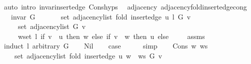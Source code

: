\begin{isabellebody}
\ {\isacharparenleft}{\kern0pt}auto\ intro{\isacharcolon}{\kern0pt}\ invar{\isacharunderscore}{\kern0pt}insert{\isacharunderscore}{\kern0pt}edge\ Cons{\isachardot}{\kern0pt}hyps{\isacharparenright}{\kern0pt}\isanewline
{}\isamarkupfalse%
%
\endisatagproof
{\isafoldproof}%
%
\isadelimproof
\isanewline
%
\endisadelimproof
\isanewline
{}\isamarkupfalse%
\ {\isacharparenleft}{\kern0pt}\ adjacency{\isacharparenright}{\kern0pt}\ adjacency{\isacharunderscore}{\kern0pt}fold{\isacharunderscore}{\kern0pt}insert{\isacharunderscore}{\kern0pt}edge{\isacharunderscore}{\kern0pt}cong{\isacharcolon}{\kern0pt}\isanewline
\ \ \ {\isachardoublequoteopen}invar\ G{\isachardoublequoteclose}\isanewline
\ \ \isanewline
\ \ \ \ {\isachardoublequoteopen}set\ {\isacharparenleft}{\kern0pt}adjacency{\isacharunderscore}{\kern0pt}list\ {\isacharparenleft}{\kern0pt}fold\ {\isacharparenleft}{\kern0pt}insert{\isacharunderscore}{\kern0pt}edge\ u{\isacharparenright}{\kern0pt}\ l\ G{\isacharparenright}{\kern0pt}\ v{\isacharparenright}{\kern0pt}\ {\isacharequal}{\kern0pt}\isanewline
\ \ \ \ \ set\ {\isacharparenleft}{\kern0pt}adjacency{\isacharunderscore}{\kern0pt}list\ G\ v{\isacharparenright}{\kern0pt}\ {\isasymunion}\isanewline
\ \ \ \ \ {\isacharparenleft}{\kern0pt}{\isasymUnion}w{\isasymin}set\ l{\isachardot}{\kern0pt}\ if\ v\ {\isacharequal}{\kern0pt}\ u\ then\ {\isacharbraceleft}{\kern0pt}w{\isacharbraceright}{\kern0pt}\ else\ if\ v\ {\isacharequal}{\kern0pt}\ w\ then\ {\isacharbraceleft}{\kern0pt}u{\isacharbraceright}{\kern0pt}\ else\ {\isacharbraceleft}{\kern0pt}{\isacharbraceright}{\kern0pt}{\isacharparenright}{\kern0pt}{\isachardoublequoteclose}\isanewline
%
\isadelimproof
\ \ %
\endisadelimproof
%
\isatagproof
{}\isamarkupfalse%
\ assms\isanewline
{}\isamarkupfalse%
\ {\isacharparenleft}{\kern0pt}induct\ l\ arbitrary{\isacharcolon}{\kern0pt}\ G{\isacharparenright}{\kern0pt}\isanewline
\ \ \isamarkupfalse%
\ Nil\isanewline
\ \ \isamarkupfalse%
\ {\isacharquery}{\kern0pt}case\isanewline
\ \ \ \ \isamarkupfalse%
\ simp\isanewline
{}\isamarkupfalse%
\isanewline
\ \ \isamarkupfalse%
\ {\isacharparenleft}{\kern0pt}Cons\ w\ ws{\isacharparenright}{\kern0pt}\isanewline
\ \ \isamarkupfalse%
\isanewline
\ \ \ \ {\isachardoublequoteopen}set\ {\isacharparenleft}{\kern0pt}adjacency{\isacharunderscore}{\kern0pt}list\ {\isacharparenleft}{\kern0pt}fold\ {\isacharparenleft}{\kern0pt}insert{\isacharunderscore}{\kern0pt}edge\ u{\isacharparenright}{\kern0pt}\ {\isacharparenleft}{\kern0pt}w\ {\isacharhash}{\kern0pt}\ ws{\isacharparenright}{\kern0pt}\ G{\isacharparenright}{\kern0pt}\ v{\isacharparenright}{\kern0pt}\ {\isacharequal}{\kern0pt}\isanewline

\end{isabellebody}
